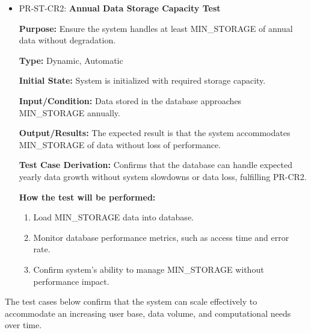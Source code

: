 \documentclass[12pt, titlepage]{article}
\begin{document}
\begin{itemize}
  \item PR-ST-CR2: \textbf{Annual Data Storage Capacity Test}
    \begin{mdframed}[linewidth=0.5mm]
      \textbf{Purpose:} Ensure the system handles at least MIN\_STORAGE of annual data without degradation. \par
      \textbf{Type:} Dynamic, Automatic \par
      \textbf{Initial State:} System is initialized with required storage capacity. \par
      \textbf{Input/Condition:} Data stored in the database approaches MIN\_STORAGE annually. \par
      \textbf{Output/Results:} The expected result is that the system accommodates \\ MIN\_STORAGE of data without loss of performance. \par
      \textbf{Test Case Derivation:} Confirms that the database can handle expected yearly data growth without system slowdowns or data loss, fulfilling PR-CR2. \par
      \textbf{How the test will be performed:}
      \begin{enumerate}[noitemsep]
        \item Load MIN\_STORAGE data into database.
        \item Monitor database performance metrics, such as access time and error rate.
        \item Confirm system’s ability to manage MIN\_STORAGE without performance impact.
      \end{enumerate}
  \end{mdframed}
\end{itemize}

\vspace{1em}
\hspace{2em}The test cases below confirm that the system can scale effectively to accommodate an increasing user base, data volume, and computational needs over time.
\end{document}
